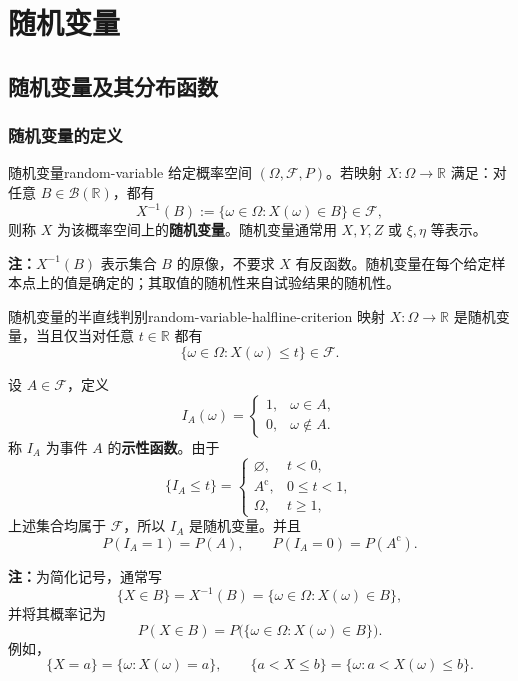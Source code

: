 \chapter{随机变量}

\section{随机变量及其分布函数}
\label{sec:random-variables-and-distribution-functions}

\subsection*{随机变量的定义}

\begin{mydefinition}{随机变量}{random-variable}
给定概率空间 $(\Omega,\mathscr F,P)$。若映射 $X:\Omega\to\mathbb R$ 满足：对任意 $B\in\mathscr B(\mathbb R)$，都有
\[
X^{-1}(B):=\{\omega\in\Omega:X(\omega)\in B\}\in\mathscr F,
\]
则称 $X$ 为该概率空间上的\textbf{随机变量}。随机变量通常用 $X,Y,Z$ 或 $\xi,\eta$ 等表示。
\end{mydefinition}

\textbf{注：}\quad $X^{-1}(B)$ 表示集合 $B$ 的原像，不要求 $X$ 有反函数。随机变量在每个给定样本点上的值是确定的；其取值的随机性来自试验结果的随机性。

\begin{proposition}{随机变量的半直线判别}{random-variable-halfline-criterion}
映射 $X:\Omega\to\mathbb R$ 是随机变量，当且仅当对任意 $t\in\mathbb R$ 都有
\[
\{\omega\in\Omega:X(\omega)\leq t\}\in\mathscr F.
\]
\end{proposition}

\begin{example}[示性函数]
设 $A\in\mathscr F$，定义
\[
I_A(\omega)=
\begin{cases}
1,&\omega\in A,\\
0,&\omega\notin A.
\end{cases}
\]
称 $I_A$ 为事件 $A$ 的\textbf{示性函数}。由于
\[
\{I_A\leq t\}=
\begin{cases}
\varnothing,&t<0,\\
A^{\mathrm c},&0\leq t<1,\\
\Omega,&t\geq1,
\end{cases}
\]
上述集合均属于 $\mathscr F$，所以 $I_A$ 是随机变量。并且
\[
P(I_A=1)=P(A),\qquad P(I_A=0)=P(A^{\mathrm c}).
\]
\end{example}

\textbf{注：}\quad 为简化记号，通常写
\[
\{X\in B\}=X^{-1}(B)=\{\omega\in\Omega:X(\omega)\in B\},
\]
并将其概率记为
\[
P(X\in B)=P\bigl(\{\omega\in\Omega:X(\omega)\in B\}\bigr).
\]
例如，
\[
\{X=a\}=\{\omega:X(\omega)=a\},
\qquad
\{a<X\leq b\}=\{\omega:a<X(\omega)\leq b\}.
\]

